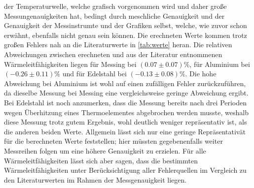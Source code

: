 der Temperaturwelle, welche grafisch vorgenommen wird und daher große Messungenauigkeiten hat, bedingt durch meschliche Genauigkeit und der Genauigkeit der Messinstrumte und
der Grafiken selbst, welche, wie zuvor schon erwähnt, ebenfalls nicht genau sein können. 
Die erechneten Werte kommen trotz großen Fehlers nah an die Literaturwerte in \autoref{tab:werte} heran.
Die relativen Abweichungen zwischen erechneten und aus der Literatur entnommenen Wärmeleitfähigkeiten liegen für Messing bei 
$(0.07 \pm 0.07) \%$, für Aluminium bei $(-0.26 \pm 0.11)\%$ und für Edelstahl bei $(-0.13 \pm 0.08) \% $. 
Die hohe Abweichung bei Aluminium ist wohl auf einen zufälligen Fehler zurückzuführen, da dieselbe Messung bei Messing eine vergleichsweise geringe Abweichung ergibt. 
Bei Edelstahl ist noch anzumerken, dass die Messung bereits nach drei Perioden wegen Überhitzung eines Thermoelementes abgebrochen werden musste, weshalb
diese Messung trotz gutem Ergebnis, wohl deutlich weniger repräsentativ ist, als die anderen beiden Werte.
Allgemein lässt sich nur eine geringe Repräsentativät für die berechneten Werte feststellen; hier müssten gegebenenfalls weiter Messreihen
folgen um eine höhere Genauigkeit zu erzielen.
Für alle Wärmeleitfähigkeiten lässt sich aber sagen, dass die bestimmten Wärmeleitfähigkeiten unter Berücksichtigung aller Fehlerquellen im Vergleich 
zu den Literaturwerten im Rahmen der Messgenauigkeit liegen.